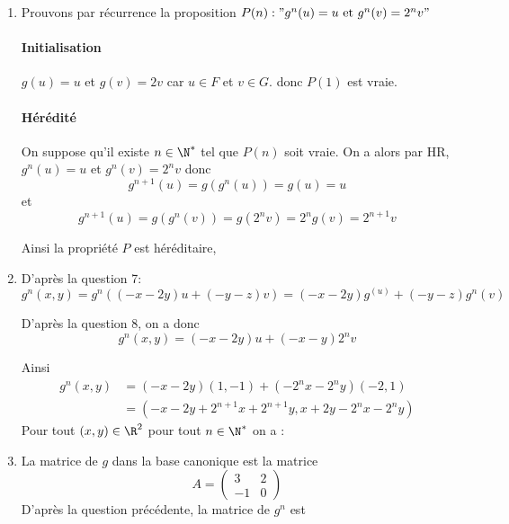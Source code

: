 \documentclass[a4paper, 11pt,reqno]{article}
\begin{document}
\begin{correction}
\begin{enumerate}

\item 
Prouvons par récurrence la proposition  $P(n):"g^n(u)  =u \text{ et } g^n (v) = 2^n v"$

\paragraph{Initialisation }
$g(u)= u$ et $ g(v) =2v$ car $u\in F$ et $v\in G$. donc $P(1) $ est vraie. 

\paragraph{Hérédité}
On suppose qu'il existe $n\in \N^*$ tel que $P(n)$ soit vraie. On a alors par HR, 
$g^n(u) = u$ et $g^n(v) =2^n v$ donc 
$$g^{n+1} (u) =g (g^n(u)) = g(u) =u$$
et $$g^{n+1} (u) =g (g^n(v)) = g(2^nv) =2^n g(v) = 2^{n+1} v$$

Ainsi la propriété $P$ est héréditaire, 

\item 
D'après la question  7: 
$$g^n (x,y) = g^n((-x-2y)u + (-y-z) v) = (-x-2y) g^(u) +(-y-z)g^n (v)$$

D'après la question 8, on a donc 
$$g^n (x,y) = (-x-2y) u + (-x-y) 2^n v$$

Ainsi 
\begin{align*}
g^n (x,y) &= (-x-2y) (1,-1) + (-2^n x -2^n y) (-2,1)\\
				&=( -x-2y +2^{n+1} x +2^{n+1} y , x+2y -2^n x-2^n y)
\end{align*}
Pour tout $(x,y) \in \R^2$ pour tout $n\in \N^* $ on a : 

\item 
La matrice de $g$ dans la base canonique est la matrice 
$$A =\begin{pmatrix}
3 & 2\\
-1 & 0
\end{pmatrix}$$
D'après la question précédente, la matrice de $g^n$ est 






\end{enumerate}
\end{correction}
\end{document}
